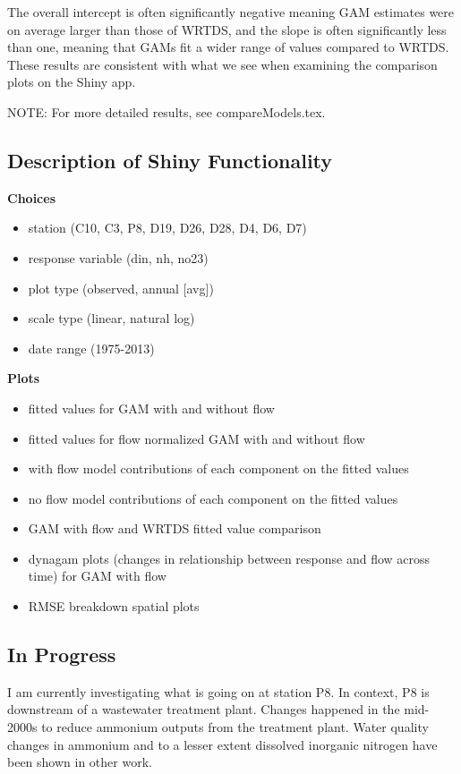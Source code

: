 \documentclass[12pt]{amsart}
\begin{document}
The overall intercept is often significantly negative meaning GAM estimates were on average larger than those of WRTDS, and the slope is often significantly less than one, meaning that GAMs fit a wider range of values compared to WRTDS. These results are consistent with what we see when examining the comparison plots on the Shiny app.

NOTE: For more detailed results, see compareModels.tex.

\subsection{Description of Shiny Functionality}


\textbf{Choices}
\begin{itemize}
\item station (C10, C3, P8, D19, D26, D28, D4, D6, D7)
\item response variable (din, nh, no23)
\item plot type (observed, annual [avg])
\item scale type (linear, natural log)
\item date range (1975-2013)
\end{itemize}

\textbf{Plots}
\begin{itemize}
\item fitted values for GAM with and without flow
\item fitted values for flow normalized GAM with and without flow 
\item with flow model contributions of each component  on the fitted values
\item no flow model contributions of each component  on the fitted values
\item GAM with flow and WRTDS fitted value comparison
\item dynagam plots (changes in relationship between response and flow across time) for GAM with flow 
\item RMSE breakdown spatial plots
\end{itemize}

\subsection{In Progress}

I am currently investigating what is going on at station P8. In context, P8 is downstream of a wastewater treatment plant. Changes happened in the mid-2000s to reduce ammonium outputs from the treatment plant. Water quality changes in ammonium and to a lesser extent dissolved inorganic nitrogen have been shown in other work.
\end{document}
